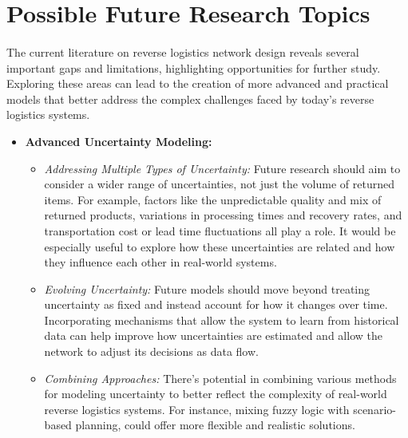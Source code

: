 \section{Possible Future Research Topics}

\paragraph{} The current literature on reverse logistics network design reveals several important gaps and limitations, highlighting opportunities for further study. Exploring these areas can lead to the creation of more advanced and practical models that better address the complex challenges faced by today’s reverse logistics systems.

\begin{itemize}[label=, leftmargin=2mm]
    \item \textbf{Advanced Uncertainty Modeling:}
        \begin{itemize}
            \item \textit{Addressing Multiple Types of Uncertainty:} Future research should aim to consider a wider range of uncertainties, not just the volume of returned items. For example, factors like the unpredictable quality and mix of returned products, variations in processing times and recovery rates, and transportation cost or lead time fluctuations all play a role. It would be especially useful to explore how these uncertainties are related and how they influence each other in real-world systems.
            \item \textit{Evolving Uncertainty:} Future models should move beyond treating uncertainty as fixed and instead account for how it changes over time. Incorporating mechanisms that allow the system to learn from historical data can help improve how uncertainties are estimated and allow the network to adjust its decisions as data flow.
            \item \textit{Combining Approaches:} There's potential in combining various methods for modeling uncertainty to better reflect the complexity of real-world reverse logistics systems. For instance, mixing fuzzy logic with scenario-based planning, could offer more flexible and realistic solutions.
        \end{itemize}


\end{itemize}

